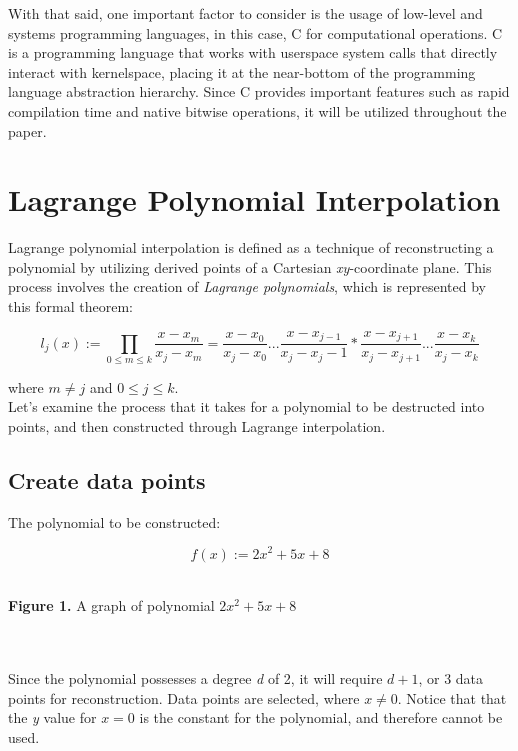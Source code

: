 \documentclass{article}
\begin{document}
With that said, one important factor to consider is the usage of low-level and systems programming languages, in this case, C for computational operations. C is a programming language that works  with userspace system calls that directly interact with kernelspace, placing it at the near-bottom of the programming language abstraction hierarchy. Since C provides important features such as rapid compilation time and native bitwise operations, it will be utilized throughout the paper.

\section{Lagrange Polynomial Interpolation}

Lagrange polynomial interpolation is defined as a technique of reconstructing a polynomial by utilizing derived points of a Cartesian \textit{xy}-coordinate plane. This process involves the creation of \textit{Lagrange polynomials}, which is represented by this formal theorem:

$$
l_j(x) := \prod_{0\leq m\leq k} \frac{x - x_m}{x_j - x_m} = \frac{x - x_0}{x_j - x_0}...\frac{x - x_{j-1}}{x_j - {x_j}-1} * \frac{x - x_{j+1}}{x_j - x_{j+1}}...\frac{x - x_k}{x_j - x_k}
$$

where $m \neq j$ and $0 \leq j \leq k$. \\

Let's examine the process that it takes for a polynomial to be destructed into points, and then constructed through Lagrange interpolation. 

\subsection{Create data points}

The polynomial to be constructed:

$$
f(x) := 2x^2 + 5x + 8
$$

\\
\caption{\textbf{Figure 1.} A graph of polynomial $2x^2 + 5x + 8$}
\\\\
Since the polynomial possesses a degree \textit{d} of 2, it will require $d + 1$, or 3 data points for reconstruction. Data points are selected, where $x \neq 0$. Notice that that the \textit{y} value for $x=0$ is the constant for the polynomial, and therefore cannot be used.
\end{document}
